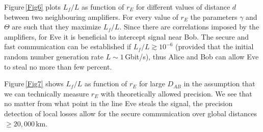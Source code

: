 \documentclass[a4paper]{article}
\begin{document}
Figure\,\ref{Fig6} plots $L_f/L$ as function of $r_E$ for different values of distance $d$ between two neighbouring amplifiers. 
For every value of $r_E$ the parameters $\gamma$ and $\Theta$ are such that they maximize $L_f/L$.
Since there are correlations imposed by the amplifiers, for Eve it is beneficial to intercept signal near Bob.
The secure and fast communication can be established if $L_f/L\gtrsim10^{-6}$ (provided that the initial random number generation rate $L\sim 1\,$Gbit/s), thus Alice and Bob can allow Eve to steal no more than few percent.

Figure\,\ref{Fig7} shows $L_f/L$ as function of $r_E$ for large $D_{AB}$ in the assumption that we can technically measure $r_E$ with theoretically allowed precision.
We see that no matter from what point in the line Eve steals the signal, the precision detection of local losses allow for the secure communication over global distances $\geq20,000$\,km.







\end{document}
